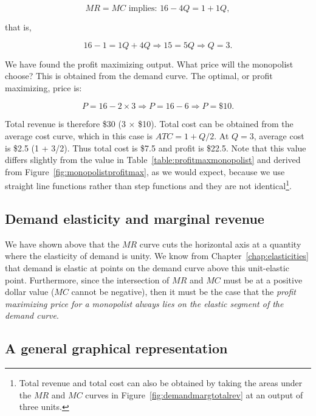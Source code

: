 \begin{equation*}
MR=MC\text{ implies: }16-4Q=1+1Q,
\end{equation*}

that is,  

\begin{equation*}
16-1=1Q+4Q\Rightarrow 15=5Q\Rightarrow Q = 3.
\end{equation*}

We have found the profit maximizing output. What price will the monopolist choose? This is obtained from the demand curve. The optimal, or profit maximizing, price is:     

\begin{equation*}
P=16-2\times 3\Rightarrow P=16-6\Rightarrow P=\$10.
\end{equation*}

Total revenue is therefore \$30 (3 $\times$ \$10). Total cost can be obtained from the average cost curve, which in this case is $ATC=1+Q/2$. At $Q=3$, average cost is \$2.5 (1 + 3/2). Thus total cost is \$7.5 and profit is \$22.5. Note that this value differs slightly from the value in Table~\ref{table:profitmaxmonopolist} and derived from Figure~\ref{fig:monopolistprofitmax}, as we would expect, because we use straight line functions rather than step functions and they are not identical\footnote{Total revenue and total cost can also be obtained by taking the areas under the $MR$ and $MC$ curves in Figure~\ref{fig:demandmargtotalrev} at an output of three units.}.

\subsection*{Demand elasticity and marginal revenue}

We have shown above that the $MR$ curve cuts the horizontal axis at a quantity where the elasticity of demand is unity. We know from Chapter~\ref{chap:elasticities} that demand is elastic at points on the demand curve above this unit-elastic point. Furthermore, since the intersection of $MR$ and $MC$ must be at a positive dollar value ($MC$ cannot be negative), then it must be the case that the \textit{profit maximizing price for a monopolist always lies on the elastic segment of the demand curve}.

\subsection*{A general graphical representation}

